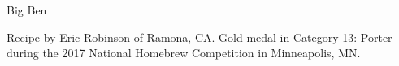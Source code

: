 \begin{recipe}{Big Ben}

\begin{aboutblock}
Recipe by Eric Robinson of Ramona, CA. Gold medal in Category 13: Porter during the
2017 National Homebrew Competition in Minneapolis, MN.
\sourceaha
\end{aboutblock}


\begin{methodandtiming}

\begin{mashsteps}
\end{mashsteps}

\begin{fermentationsteps}
\end{fermentationsteps}

\end{methodandtiming}

\recipebreak

\begin{ingredientsblock}

\begin{malts}
\end{malts}

\begin{hops}
\end{hops}


\end{ingredientsblock}

\end{recipe}

